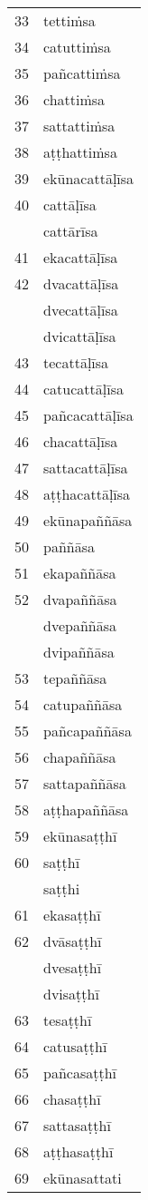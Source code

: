 \begin{multicols}{4}
\begin{supertabular}{l|l}
33	&	tettiṁsa\\
34	&	catuttiṁsa\\
35	&	pañcattiṁsa\\
36	&	chattiṁsa\\
37	&	sattattiṁsa\\
38	&	aṭṭhattiṁsa\\
39	&	ekūnacattāḷīsa\\
40	&	cattāḷīsa\\
	&	cattārīsa\\
41	&	ekacattāḷīsa\\
42	&	dvacattāḷīsa\\
	&	dvecattāḷīsa\\
	&	dvicattāḷīsa\\
43	&	tecattāḷīsa\\
44	&	catucattāḷīsa\\
45	&	pañcacattāḷīsa\\
46	&	chacattāḷīsa\\
47	&	sattacattāḷīsa\\
48	&	aṭṭhacattāḷīsa\\
49	&	ekūnapaññāsa\\
50	&	paññāsa\\
51	&	ekapaññāsa\\
52	&	dvapaññāsa\\
	&	dvepaññāsa\\
	&	dvipaññāsa\\
53	&	tepaññāsa\\
54	&	catupaññāsa\\
55	&	pañcapaññāsa\\
56	&	chapaññāsa\\
57	&	sattapaññāsa\\
58	&	aṭṭhapaññāsa\\
59	&	ekūnasaṭṭhī\\
60	&	saṭṭhī\\
	&	saṭṭhi\\
61	&	ekasaṭṭhī\\
62	&	dvāsaṭṭhī\\
	&	dvesaṭṭhī\\
	&	dvisaṭṭhī\\
63	&	tesaṭṭhī\\
64	&	catusaṭṭhī\\
65	&	pañcasaṭṭhī\\
66	&	chasaṭṭhī\\
67	&	sattasaṭṭhī\\
68	&	aṭṭhasaṭṭhī\\
69	&	ekūnasattati\\

\end{supertabular}
\end{multicols}
